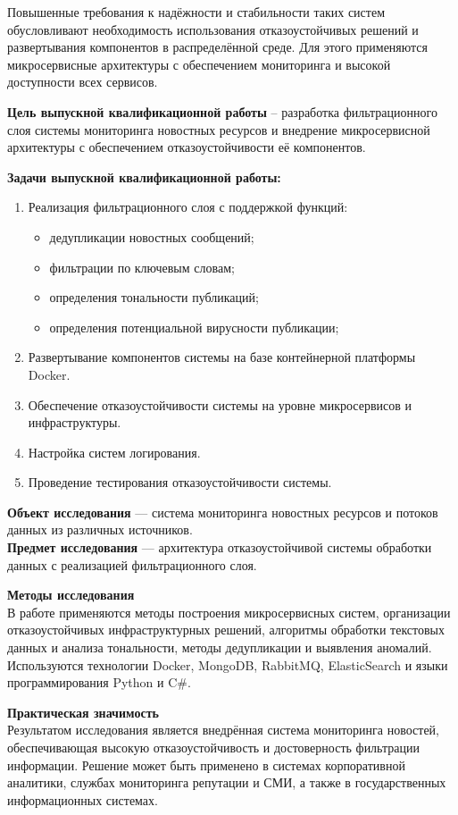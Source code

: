 Повышенные требования к надёжности и стабильности таких систем обусловливают необходимость использования отказоустойчивых решений и развертывания компонентов в распределённой среде.
Для этого применяются микросервисные архитектуры с обеспечением мониторинга и высокой доступности всех сервисов.

\textbf{Цель выпускной квалификационной работы} -- разработка фильтрационного слоя системы мониторинга новостных
ресурсов и внедрение микросервисной архитектуры с обеспечением отказоустойчивости её компонентов.

\textbf{Задачи выпускной квалификационной работы:}
\begin{enumerate}
\item Реализация фильтрационного слоя с поддержкой функций:
    \begin{itemize}
    \item дедупликации новостных сообщений;
    \item фильтрации по ключевым словам;
    \item определения тональности публикаций;
    \item определения потенциальной вирусности публикации;
    \end{itemize}
\item Развертывание компонентов системы на базе контейнерной платформы Docker.
\item Обеспечение отказоустойчивости системы на уровне микросервисов и инфраструктуры.
\item Настройка систем логирования.
\item Проведение тестирования отказоустойчивости системы.
\end{enumerate}

\textbf{Объект исследования} — система мониторинга новостных ресурсов и потоков данных из различных источников.\\
\textbf{Предмет исследования} — архитектура отказоустойчивой системы обработки данных с реализацией фильтрационного слоя.

\textbf{Методы исследования}\\
В работе применяются методы построения микросервисных систем, организации отказоустойчивых инфраструктурных решений, алгоритмы обработки текстовых данных и анализа тональности, методы дедупликации и выявления аномалий.
Используются технологии Docker, MongoDB, RabbitMQ, ElasticSearch и языки программирования Python и C\#.

\textbf{Практическая значимость}\\
Результатом исследования является внедрённая система мониторинга новостей, обеспечивающая высокую отказоустойчивость и достоверность фильтрации информации.
Решение может быть применено в системах корпоративной аналитики, службах мониторинга репутации и СМИ, а также в государственных информационных системах.


